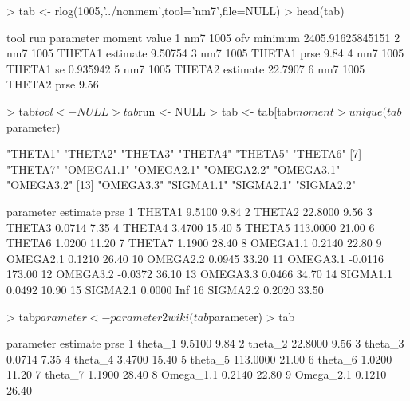 \begin{Schunk}
\begin{Sinput}
> tab <- rlog(1005,'../nonmem',tool='nm7',file=NULL)
> head(tab)
\end{Sinput}
\begin{Soutput}
  tool  run parameter   moment            value
1  nm7 1005       ofv  minimum 2405.91625845151
2  nm7 1005    THETA1 estimate          9.50754
3  nm7 1005    THETA1     prse             9.84
4  nm7 1005    THETA1       se         0.935942
5  nm7 1005    THETA2 estimate          22.7907
6  nm7 1005    THETA2     prse             9.56
\end{Soutput}
\begin{Sinput}
> tab$tool <- NULL
> tab$run <- NULL
> tab <- tab[tab$moment %in% c('estimate','prse'),]
> unique(tab$parameter)
\end{Sinput}
\begin{Soutput}
 [1] "THETA1"   "THETA2"   "THETA3"   "THETA4"   "THETA5"   "THETA6"  
 [7] "THETA7"   "OMEGA1.1" "OMEGA2.1" "OMEGA2.2" "OMEGA3.1" "OMEGA3.2"
[13] "OMEGA3.3" "SIGMA1.1" "SIGMA2.1" "SIGMA2.2"
\end{Soutput}
\begin{Soutput}
   parameter estimate   prse
1     THETA1   9.5100   9.84
2     THETA2  22.8000   9.56
3     THETA3   0.0714   7.35
4     THETA4   3.4700  15.40
5     THETA5 113.0000  21.00
6     THETA6   1.0200  11.20
7     THETA7   1.1900  28.40
8   OMEGA1.1   0.2140  22.80
9   OMEGA2.1   0.1210  26.40
10  OMEGA2.2   0.0945  33.20
11  OMEGA3.1  -0.0116 173.00
12  OMEGA3.2  -0.0372  36.10
13  OMEGA3.3   0.0466  34.70
14  SIGMA1.1   0.0492  10.90
15  SIGMA2.1   0.0000    Inf
16  SIGMA2.2   0.2020  33.50
\end{Soutput}
\begin{Sinput}
> tab$parameter <- parameter2wiki(tab$parameter)
> tab
\end{Sinput}
\begin{Soutput}
    parameter estimate   prse
1    theta_1    9.5100   9.84
2    theta_2   22.8000   9.56
3    theta_3    0.0714   7.35
4    theta_4    3.4700  15.40
5    theta_5  113.0000  21.00
6    theta_6    1.0200  11.20
7    theta_7    1.1900  28.40
8  Omega_1.1    0.2140  22.80
9  Omega_2.1    0.1210  26.40

\end{Soutput}
\end{Schunk}
